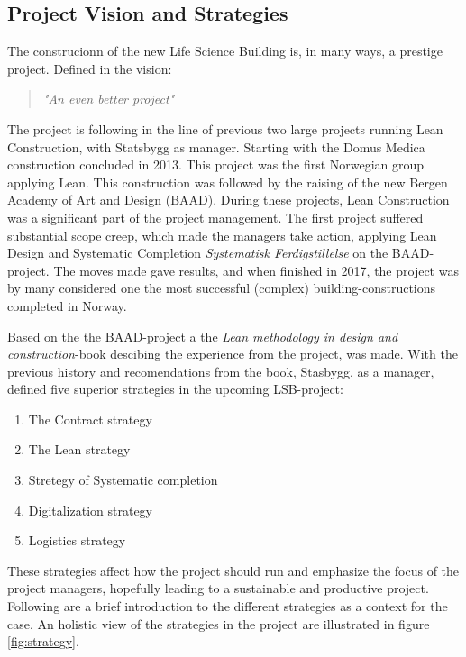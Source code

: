 \subsection{Project Vision and Strategies}
The construcionn of the new Life Science Building is, in many ways, a prestige project. Defined in the vision:
\begin{quotation}
    \textit{"An even better project"}
\end{quotation}
The project is following in the line of previous two large projects running Lean Construction, with Statsbygg as manager. Starting with the Domus Medica construction concluded in 2013. This project was the first Norwegian group applying Lean. This construction was followed by the raising of the new Bergen Academy of Art and Design (BAAD). During these projects, Lean Construction was a significant part of the project management. The first project suffered substantial scope creep, which made the managers take action, applying Lean Design and Systematic Completion \textit{Systematisk Ferdigstillelse} on the BAAD-project. The moves made gave results, and when finished in 2017, the project was by many considered one the most successful (complex) building-constructions completed in Norway.

Based on the the BAAD-project a the \textit{Lean methodology in design and construction}-book \cite{lean_i_praksis} descibing the experience from the project, was made. With the previous history and recomendations from the book, Stasbygg, as a manager, defined five superior strategies in the upcoming LSB-project: 
\begin{enumerate}
    \item The Contract strategy
    \item The Lean strategy
    \item Stretegy of Systematic completion
    \item Digitalization strategy
    \item Logistics strategy
\end{enumerate}
These strategies affect how the project should run and emphasize the focus of the project managers, hopefully leading to a sustainable and productive project. Following are a brief introduction to the different strategies as a context for the case. An holistic view of the strategies in the project are illustrated in figure \ref{fig:strategy}. 

